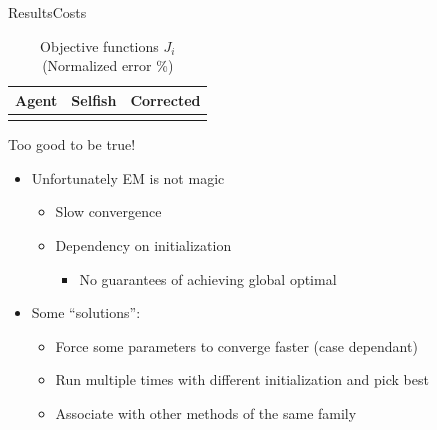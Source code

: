 \documentclass[aspectratio=169]{beamer}
\begin{document}

\begin{frame}{Results}{Costs}
  \begin{table}[h]
    \centering
    \caption*{Objective functions $J_{i}$ (Normalized error \%)}\label{tab:eq_costsGlobalLocal}
    \begin{tabular}[t]{crr}
      \toprule
      Agent  & Selfish & Corrected\\
      \midrule
      \\
      \bottomrule
    \end{tabular}
  \end{table}
\end{frame}

\begin{frame}{Too good to be true!}{}
  \begin{itemize}[<+(1)->]
    \item Unfortunately EM is not magic
          \begin{itemize}
            \item Slow convergence
            \item Dependency on initialization
                  \begin{itemize}
                    \item No guarantees of achieving global optimal
                  \end{itemize}
          \end{itemize}
    \item Some ``solutions'':
          \begin{itemize}
            \item Force some parameters to converge faster (case dependant)
            \item Run multiple times with different initialization and pick best
            \item Associate with other methods of the same family
          \end{itemize}
  \end{itemize}
\end{frame}
\end{document}
